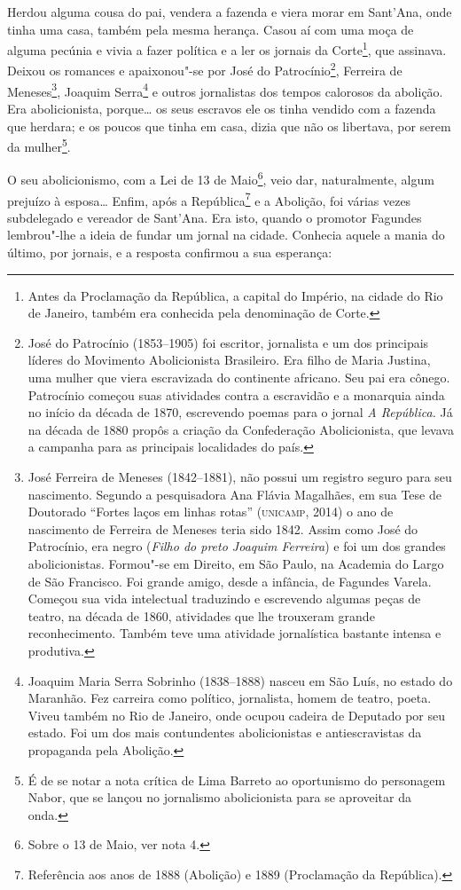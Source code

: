 Herdou alguma cousa do pai, vendera a fazenda e viera morar em Sant'Ana,
onde tinha uma casa, também pela mesma herança. Casou aí com uma moça de
alguma pecúnia e vivia a fazer política e a ler os jornais da
Corte\footnote{Antes da Proclamação da República, a capital do Império,
  na cidade do Rio de Janeiro, também era conhecida pela denominação de
  Corte.}, que assinava. Deixou os romances e apaixonou"-se por José do
Patrocínio\footnote{José do Patrocínio (1853--1905) foi escritor,
  jornalista e um dos principais líderes do Movimento Abolicionista
  Brasileiro. Era filho de Maria Justina, uma mulher que viera
  escravizada do continente africano. Seu pai era cônego. Patrocínio
  começou suas atividades contra a escravidão e a monarquia ainda no
  início da década de 1870, escrevendo poemas para o jornal \emph{A
  República.} Já na década de 1880 propôs a criação da Confederação
  Abolicionista, que levava a campanha para as principais localidades do
  país.}, Ferreira de Meneses\footnote{José Ferreira de Meneses (1842--1881), não possui um registro seguro para seu nascimento. Segundo a
  pesquisadora Ana Flávia Magalhães, em sua Tese de Doutorado ``Fortes
  laços em linhas rotas'' (\textsc{unicamp}, 2014) o ano de nascimento de
  Ferreira de Meneses teria sido 1842. Assim como José do Patrocínio,
  era negro (\emph{Filho do preto Joaquim Ferreira}) e foi um dos
  grandes abolicionistas. Formou"-se em Direito, em São Paulo, na
  Academia do Largo de São Francisco. Foi grande amigo, desde a
  infância, de Fagundes Varela. Começou sua vida intelectual traduzindo
  e escrevendo algumas peças de teatro, na década de 1860, atividades
  que lhe trouxeram grande reconhecimento. Também teve uma atividade
  jornalística bastante intensa e produtiva.}, Joaquim Serra\footnote{Joaquim
  Maria Serra Sobrinho (1838--1888) nasceu em São Luís, no estado do
  Maranhão. Fez carreira como político, jornalista, homem de teatro,
  poeta. Viveu também no Rio de Janeiro, onde ocupou cadeira de Deputado
  por seu estado. Foi um dos mais contundentes abolicionistas e
  antiescravistas da propaganda pela Abolição.} e outros jornalistas dos
tempos calorosos da abolição. Era abolicionista, porque\ldots{} os seus
escravos ele os tinha vendido com a fazenda que herdara; e os poucos que
tinha em casa, dizia que não os libertava, por serem da mulher\footnote{É
  de se notar a nota crítica de Lima Barreto ao oportunismo do
  personagem Nabor, que se lançou no jornalismo abolicionista para se
  aproveitar da onda.}.

O seu abolicionismo, com a Lei de 13 de Maio\footnote{Sobre o 13 de
  Maio, ver nota 4.}, veio dar, naturalmente, algum prejuízo à
esposa\ldots{} Enfim, após a República\footnote{Referência aos anos de
  1888 (Abolição) e 1889 (Proclamação da República).} e a Abolição, foi
várias vezes subdelegado e vereador de Sant'Ana. Era isto, quando o
promotor Fagundes lembrou"-lhe a ideia de fundar um jornal na cidade.
Conhecia aquele a mania do último, por jornais, e a resposta confirmou a
sua esperança:

